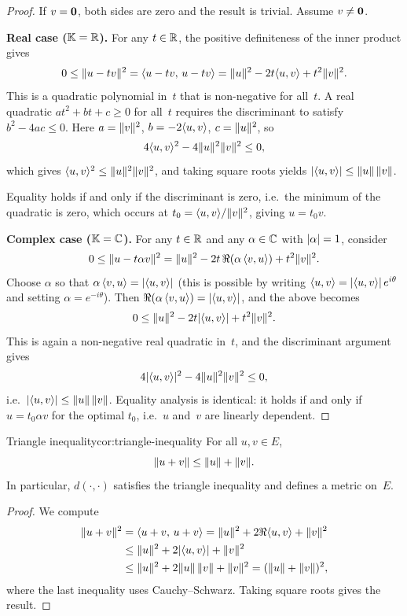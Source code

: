 \begin{proof}
If $v = \mathbf{0}$, both sides are zero and the result is trivial.  Assume
$v\neq\mathbf{0}$.

\medskip\noindent\textbf{Real case (${\mathbb{K}} = {\mathbb{R}}$).}\quad
For any $t\in{\mathbb{R}}$, the positive definiteness of the inner product gives
\[
  0 \leq \lVert u - tv\rVert^2
    = \langle u - tv,\, u - tv\rangle
    = \lVert u\rVert^2 - 2t\langle u,v\rangle + t^2\lVert v\rVert^2.
\]
This is a quadratic polynomial in~$t$ that is non-negative for all~$t$.
A real quadratic $at^2 + bt + c\geq 0$ for all~$t$ requires the
discriminant to satisfy $b^2 - 4ac \leq 0$.  Here
$a = \lVert v\rVert^2$, $b = -2\langle u,v\rangle$, $c = \lVert u\rVert^2$, so
\[
  4\langle u,v\rangle^2 - 4\lVert u\rVert^2\lVert v\rVert^2 \leq 0,
\]
which gives $\langle u,v\rangle^2 \leq \lVert u\rVert^2\lVert v\rVert^2$, and taking
square roots yields $\lvert\langle u,v\rangle\rvert\leq\lVert u\rVert\,\lVert v\rVert$.

Equality holds if and only if the discriminant is zero, i.e.\ the
minimum of the quadratic is zero, which occurs at
$t_0 = \langle u,v\rangle/\lVert v\rVert^2$, giving $u = t_0 v$.

\medskip\noindent\textbf{Complex case (${\mathbb{K}} = {\mathbb{C}}$).}\quad
For any $t\in{\mathbb{R}}$ and any $\alpha\in{\mathbb{C}}$ with $\lvert\alpha\rvert=1$, consider
\[
  0 \leq \lVert u - t\alpha v\rVert^2
    = \lVert u\rVert^2 - 2t\,\Re(\alpha\,\langle v,u\rangle)
      + t^2\lVert v\rVert^2.
\]
Choose $\alpha$ so that $\alpha\,\langle v,u\rangle = \lvert\langle u,v\rangle\rvert$
(this is possible by writing $\langle u,v\rangle = \lvert\langle u,v\rangle\rvert\,e^{i\theta}$
and setting $\alpha = e^{-i\theta}$).  Then
$\Re(\alpha\,\langle v,u\rangle) = \lvert\langle u,v\rangle\rvert$, and the above becomes
\[
  0 \leq \lVert u\rVert^2 - 2t\lvert\langle u,v\rangle\rvert + t^2\lVert v\rVert^2.
\]
This is again a non-negative real quadratic in~$t$, and the discriminant
argument gives
\[
  4\lvert\langle u,v\rangle\rvert^2 - 4\lVert u\rVert^2\lVert v\rVert^2 \leq 0,
\]
i.e.\ $\lvert\langle u,v\rangle\rvert\leq\lVert u\rVert\,\lVert v\rVert$.  Equality analysis is
identical: it holds if and only if $u = t_0\alpha v$ for the optimal
$t_0$, i.e.\ $u$ and~$v$ are linearly dependent.
\end{proof}

\begin{corollary}{Triangle inequality}{cor:triangle-inequality}
For all $u,v\in E$,
\[
  \lVert u+v\rVert\leq\lVert u\rVert+\lVert v\rVert.
\]
In particular, $d(\cdot,\cdot)$ satisfies the triangle inequality and
defines a metric on~$E$.
\end{corollary}

\begin{proof}
We compute
\begin{align*}
  \lVert u+v\rVert^2
    &= \langle u+v,\,u+v\rangle
    = \lVert u\rVert^2 + 2\Re\langle u,v\rangle + \lVert v\rVert^2 \\
    &\leq \lVert u\rVert^2 + 2\lvert\langle u,v\rangle\rvert + \lVert v\rVert^2 \\
    &\leq \lVert u\rVert^2 + 2\lVert u\rVert\,\lVert v\rVert + \lVert v\rVert^2
    = (\lVert u\rVert + \lVert v\rVert)^2,
\end{align*}
where the last inequality uses Cauchy--Schwarz.  Taking square roots
gives the result.
\end{proof}


